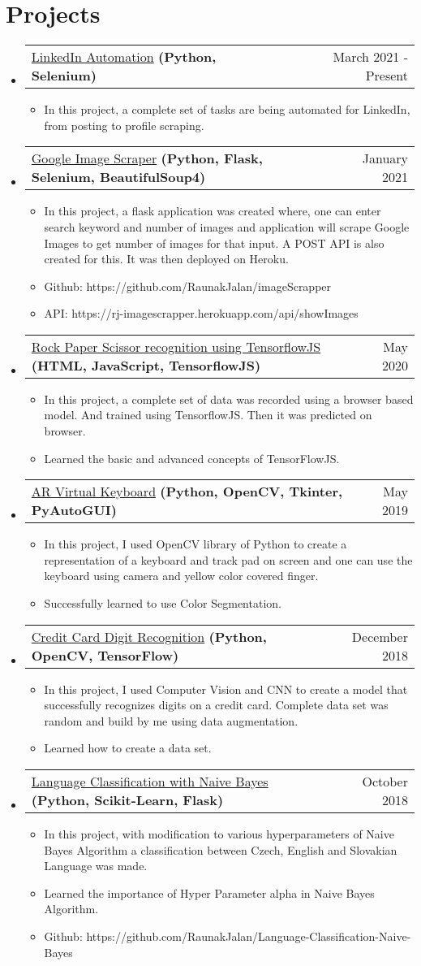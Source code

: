 \documentclass[letterpaper,11pt]{article}
\makeatletter
\newcommand{\sectionStart}{
  \begin{itemize}[label={},leftmargin=0in]
}
\newcommand{\sectionEnd}{
  \end{itemize}
}
\newcommand{\projectHeading}[4]{
  \vspace{-1pt}
  \item
  \begin{tabular*}{1.0\textwidth}{l@{\extracolsep{\fill}}r@{}}
    \normalsize{{\href{#1}{#2}} \textbf{#3}} & #4 \\
  \end{tabular*}\vspace{-5pt}
}
\newcommand{\listStart}{\begin{itemize}}
\newcommand{\listEnd}{\end{itemize}\vspace{-5pt}}
\newcommand{\bulletItem}[1]{
  \item
  \small{
    {#1 \vspace{-1.8pt}}
  }
}
\makeatother
\begin{document}
\section{Projects}
\sectionStart
  \projectHeading
    {https://github.com/RaunakJalan/LinkedIn_Automation}
    {LinkedIn Automation}
    {(Python, Selenium)}
    {March 2021 - Present}
  \listStart
    \bulletItem
      {In this project, a complete set of tasks are being automated for LinkedIn, from posting to profile scraping.}
  \listEnd  
  \projectHeading
    {https://rj-imagescrapper.herokuapp.com/}
    {Google Image Scraper}
    {(Python, Flask, Selenium, BeautifulSoup4)}
    {January 2021}
  \listStart
    \bulletItem
      {In this project, a flask application was created where, one can enter search keyword and number of images and application will scrape Google Images to get number of images for that input. A POST API is also created for this. It was then deployed on Heroku.}
    \bulletItem
      {Github: https://github.com/RaunakJalan/imageScrapper}
	\bulletItem
      {API: https://rj-imagescrapper.herokuapp.com/api/showImages}
  \listEnd
  \projectHeading
    {https://github.com/RaunakJalan/TensorFlow-Deployment-Course-Coursera/tree/master/Browser_Based_Model/Week_4/Rock_paper_scissor}
    {Rock Paper Scissor recognition using TensorflowJS}
    {(HTML, JavaScript, TensorflowJS)}
    {May 2020}
  \listStart
    \bulletItem
      {In this project, a complete set of data was recorded using a browser based model. And trained using TensorflowJS. Then it was predicted on browser.}
	\bulletItem
	  {Learned the basic and advanced concepts of TensorFlowJS.}
  \listEnd  
  \projectHeading
    {https://github.com/RaunakJalan/Virtual-Keyboard-OpenCV}
    {AR Virtual Keyboard}
    {(Python, OpenCV, Tkinter, PyAutoGUI)}
    {May 2019}
  \listStart
    \bulletItem
      {In this project, I used OpenCV library of Python to create a representation of a keyboard and track pad on screen and one can use the keyboard using camera and yellow color covered finger.}
    \bulletItem
      {Successfully learned to use Color Segmentation.}
  \listEnd
  \projectHeading
    {https://github.com/RaunakJalan/Credit-Card-Number-Identification}
    {Credit Card Digit Recognition}
    {(Python, OpenCV, TensorFlow)}
    {December 2018}
  \listStart
    \bulletItem
      {In this project, I used Computer Vision and CNN to create a model that successfully recognizes digits on a credit card. Complete data set was random and build by me using data augmentation.}
    \bulletItem
      {Learned how to create a data set.}
  \listEnd
  \projectHeading
    {https://rj-language-classification.herokuapp.com/}
    {Language Classification with Naive Bayes}
    {(Python, Scikit-Learn, Flask)}
    {October 2018}
  \listStart
    \bulletItem
      {In this project, with modification to various hyperparameters of Naive Bayes Algorithm a classification between Czech, English and Slovakian Language was made.}
	\bulletItem
	  {Learned the importance of Hyper Parameter alpha in Naive Bayes Algorithm.}
	\bulletItem
      {Github: https://github.com/RaunakJalan/Language-Classification-Naive-Bayes}
  \listEnd
\sectionEnd
  
\end{document}
